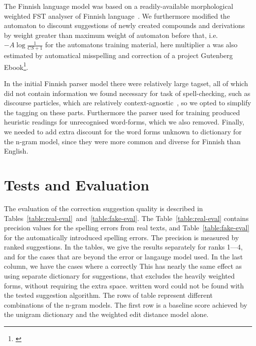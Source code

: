 \documentclass{llncs}
\begin{document}
The Finnish language model was based on a readily-available morphological
weighted FST analyser of Finnish language~\cite{pirinen/2011/nodalida}.  We
furthermore modified the automaton to discount suggestions of newly created
compounds and derivations by weight greater than maximum weight of automaton
before that, i.e. $-A\log\frac{1}{CS+1}$ for the automatons training material,
here multiplier a was also estimated by automatical misspelling and correction
of a project Gutenberg Ebook\footnote{\url{}}.

In the initial Finnish parser model there were relatively large tagset, all of
which did not contain information we found necessary for task of
spell-checking, such as discourse particles, which are relatively
context-agnostic~\cite{visk}, so we opted to simplify the tagging on these
parts. Furthermore the parser used for training produced heuristic readings for
unrecognised word-forms, which we also removed. Finally, we needed to add
extra discount for the word forms unknown to dictionary for the n-gram model,
since they were more common and diverse for Finnish than English.

\section{Tests and Evaluation}
\label{sec:evaluation}

The evaluation of the correction suggestion quality is described in
Tables~\ref{table:real-eval}~and~\ref{table:fake-eval}. The
Table~\ref{table:real-eval} contains precision values for the spelling errors
from real texts, and Table~\ref{table:fake-eval} for the automatically
introduced spelling errors. The precision is measured by ranked suggestions. In
the tables, we give the results separately for ranks 1---4, and for the cases
that are beyond the error or langauge model used.  In the last column, we have
the cases where a correctly This has nearly the same effect as using separate
dictionary for suggestions, that excludes the heavily weighted forms, without
requiring the extra space.  written word could not be found with the tested
suggestion algorithm.  The rows of table represent different combinations of
the n-gram models. The first row is a baseline score achieved by the unigram
dictionary and the weighted edit distance model alone.
\end{document}
